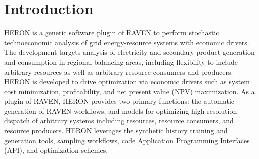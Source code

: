 \section{Introduction}
HERON is a generic software plugin of RAVEN to perform stochastic technoeconomic analysis of grid energy-resource systems with economic drivers. The development targets analysis of electricity and
secondary product generation and consumption in regional balancing areas, including flexibility to include arbitrary resources as well as arbitrary resource consumers and producers. HERON is developed to drive optimization via economic drivers such as system cost minimization, profitability, and net present value (NPV) maximization. As a plugin of RAVEN, HERON provides two primary functions: the automatic generation of RAVEN workflows, and models for optimizing high-resolution dispatch of arbitrary systems including resources, resource consumers, and resource producers. HERON leverages the synthetic history training and generation tools, sampling workflows, code Application Programming Interfaces (API), and optimization schemes. 